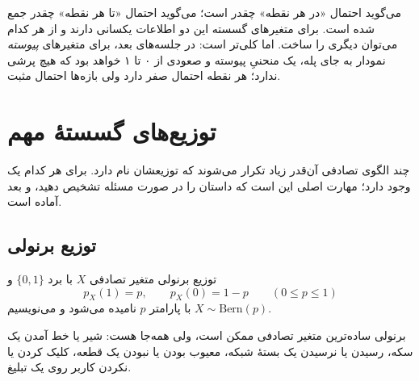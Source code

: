 \begin{intuition}
 می‌گوید احتمال «در هر نقطه» چقدر است؛  می‌گوید احتمال «تا هر نقطه» چقدر جمع شده است. برای متغیرهای گسسته این دو اطلاعات یکسانی دارند و از هر کدام می‌توان دیگری را ساخت. اما  کلی‌تر است: در جلسه‌های بعد، برای متغیرهای \emph{پیوسته} نمودار  به جای پله، یک منحنیِ پیوسته و صعودی از ۰ تا ۱ خواهد بود که هیچ پرشی ندارد؛ هر نقطه احتمال صفر دارد ولی بازه‌ها احتمال مثبت.
\end{intuition}
\section{توزیع‌های گسستهٔ مهم}

چند الگوی تصادفی آن‌قدر زیاد تکرار می‌شوند که توزیعشان نام دارد. برای هر کدام یک  وجود دارد؛ مهارت اصلی این است که داستان را در صورت مسئله تشخیص دهید، و بعد  آماده است.

\subsection{توزیع برنولی}

\begin{definition}[label=def:bern]{توزیع برنولی}
متغیر تصادفی $X$ با برد $\{0,1\}$ و
\[ p_X(1)=p,\qquad p_X(0)=1-p\qquad(0\le p\le1) \]
 با پارامتر $p$ نامیده می‌شود و می‌نویسیم $X\sim\mathrm{Bern}(p)$.
\end{definition}

\begin{center}
\end{center}

برنولی ساده‌ترین متغیر تصادفی ممکن است، ولی همه‌جا هست: شیر یا خط آمدن یک سکه، رسیدن یا نرسیدن یک بستهٔ شبکه، معیوب بودن یا نبودن یک قطعه، کلیک کردن یا نکردن کاربر روی یک تبلیغ.

